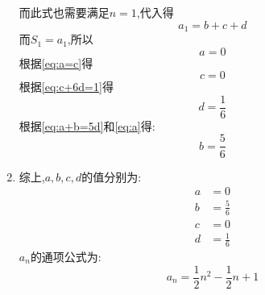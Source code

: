 \begin{questions}
\begin{solution}
\begin{enumerate}[label=\protect\circled{\arabic*}]
			      而此式也需要满足$n=1$,代入得
			      \begin{equation}
				      a_1 = b+c+d
				      \label{eq:a1}
			      \end{equation}
			      而$S_1= a_1$,所以
			      \begin{equation}
				      a= 0
				      \label{eq:a}
			      \end{equation}
			      根据\eqref{eq:a=c}得
			      \begin{equation}
				      c = 0
				      \label{eq:c}
			      \end{equation}
			      根据\eqref{eq:c+6d=1}得
			      \begin{equation}
				      d = \frac16
				      \label{eq:d}
			      \end{equation}
			      根据\eqref{eq:a+b=5d}和\eqref{eq:a}得:
			      \begin{equation}
				      b = \frac56
				      \label{eq:b}
			      \end{equation}

			\item 综上,$a,b,c,d$的值分别为:
			      \begin{align*}
				      a & = 0       \\
				      b & = \frac56 \\
				      c & = 0       \\
				      d & = \frac16
			      \end{align*}
			      $a_n$的通项公式为:
			      \begin{equation*}
				      a_n = \frac12n^2 - \frac12n + 1
			      \end{equation*}

		\end{enumerate}

	\end{solution}
	\begin{center}

\end{center}
\end{questions}
